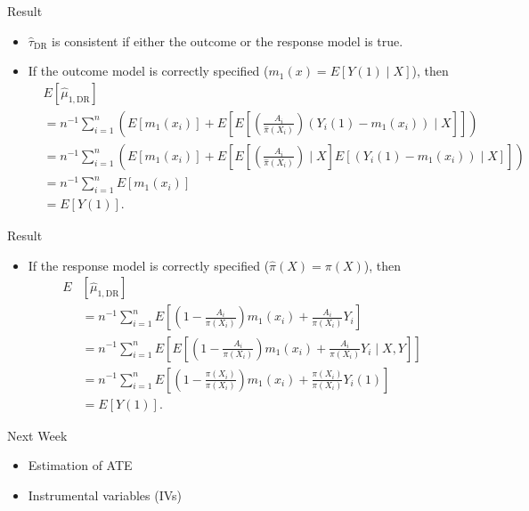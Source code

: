 \documentclass[handout]{beamer} %
\begin{document}
\begin{frame}{Result}

\begin{itemize}
    \item $\hat \tau_{\text{DR}}$ is consistent if either the outcome or the
      response model is true.
    \item If the outcome model is correctly specified ($m_1(x) = E[Y(1) \mid
      X]$), then
      {\footnotesize
    \begin{align*}
      &E[\hat \mu_{1, \text{DR}}] \\
    &=  n^{-1} \sum_{i = 1}^n \left(E[m_1(x_i)] + 
      E\left[E\left[\left(\frac{A_i}{\hat \pi(X_i)}\right) (Y_i(1) - m_1(x_i)) 
      \mid X \right]\right] \right)\\
    &=  n^{-1} \sum_{i = 1}^n \left(E[m_1(x_i)] + 
      E\left[E\left[\left(\frac{A_i}{\hat \pi(X_i)}\right) \mid X\right] 
      E\left[(Y_i(1) - m_1(x_i))
      \mid X\right]\right] \right)\\
    &=  n^{-1} \sum_{i = 1}^n E[m_1(x_i)]\\
    &=  E[Y(1)].
    \end{align*}
    }
\end{itemize}

\end{frame}

\begin{frame}{Result}

\begin{itemize}
    \item If the response model is correctly specified ($\hat \pi(X) = \pi(X)$),
      then
    \begin{align*}
      E&[\hat \mu_{1, \text{DR}}] \\
    &=  n^{-1} \sum_{i = 1}^n E\left[\left(1 - \frac{A_i}{\pi(X_i)}\right)m_1(x_i) 
    + \frac{A_i}{\pi(X_i)}Y_i\right]\\
    &=  n^{-1} \sum_{i = 1}^n E\left[E\left[\left(1 - \frac{A_i}{\pi(X_i)}\right)m_1(x_i) 
    + \frac{A_i}{\pi(X_i)}Y_i\mid X, Y\right]\right]\\
    &=  n^{-1} \sum_{i = 1}^n E\left[\left(1 - \frac{\pi(X_i)}{\pi(X_i)}\right)m_1(x_i) 
    + \frac{\pi(X_i)}{\pi(X_i)}Y_i(1)\right]\\
    &= E[Y(1)].
    \end{align*}
\end{itemize}
    
\end{frame}

\begin{frame}{Next Week}

\begin{itemize}
    \item Estimation of ATE
    \item Instrumental variables (IVs)
\end{itemize}

\end{frame}
\end{document}
